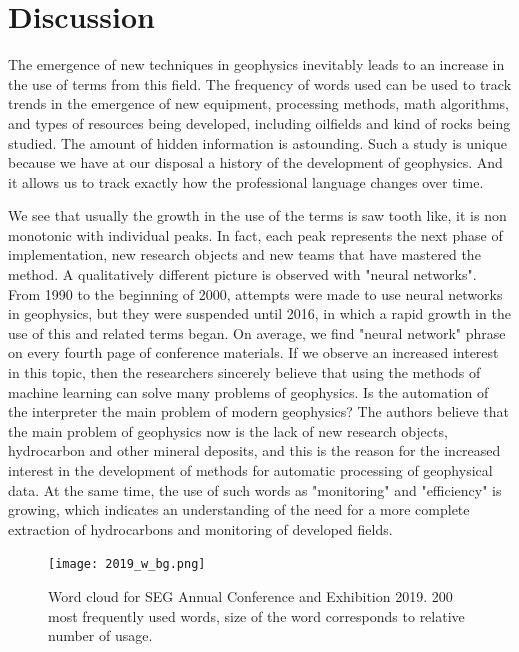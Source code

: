\documentclass[geosciences,article,submit,moreauthors,pdftex]{Definitions/mdpi}
\begin{document}
\section{Discussion}

The emergence of new techniques in geophysics inevitably leads to an increase in the use of terms from this field. The frequency of words used can be used to track trends in the emergence of new equipment, processing methods, math algorithms, and types of resources being developed, including oilfields and kind of rocks being studied. The amount of hidden information is astounding. Such a study is unique because we have at our disposal a history of the development of geophysics. And it allows us to track exactly how the professional language changes over time.

We see that usually the growth in the use of the terms is saw tooth like, it is non monotonic with individual peaks. In fact, each peak represents the next phase of implementation, new research objects and new teams that have mastered the method. A qualitatively different picture is observed with "neural networks". From 1990 to the beginning of 2000, attempts were made to use neural networks in geophysics, but they were suspended until 2016, in which a rapid growth in the use of this and related terms began. On average, we find "neural network" phrase on every fourth page of conference materials. If we observe an increased interest in this topic, then the researchers sincerely believe that using the methods of machine learning can solve many problems of geophysics. Is the automation of the interpreter the main problem of modern geophysics? The authors believe that the main problem of geophysics now is the lack of new research objects, hydrocarbon and other mineral deposits, and this is the reason for the increased interest in the development of methods for automatic processing of geophysical data. At the same time, the use of such words as "monitoring" and "efficiency" is growing, which indicates an understanding of the need for a more complete extraction of hydrocarbons and monitoring of developed fields.


\begin{figure}[ht!]
\centering
\texttt{[image: 2019\_w\_bg.png]}
\caption{Word cloud for SEG Annual Conference and Exhibition 2019. 200 most frequently used words, size of the word corresponds to relative number of usage.}
\label{2019_w_bg}
\end{figure}
\end{document}
